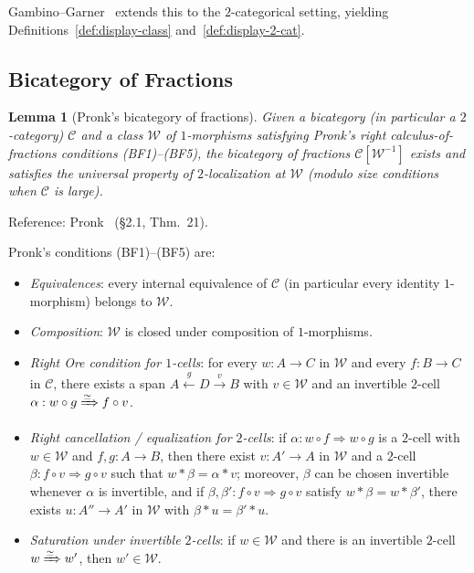 \documentclass[11pt]{article}
\theoremstyle{plain}
\newtheorem{lemma}[theorem]{Lemma}
\theoremstyle{definition}
\newcommand{\cC}{\mathcal{C}}
\begin{document}
Gambino--Garner~\cite{GambinoGarner2008} extends this to the $2$-categorical setting, yielding Definitions~\ref{def:display-class} and~\ref{def:display-2-cat}.

\subsection{Bicategory of Fractions}

\begin{lemma}[Pronk's bicategory of fractions]\label{lem:pronk}
Given a bicategory (in particular a $2$-category) $\cC$ and a class $\mathcal{W}$ of $1$-morphisms satisfying Pronk's right calculus-of-fractions conditions (BF1)--(BF5), the bicategory of fractions $\cC[\mathcal{W}^{-1}]$ exists and satisfies the universal property of $2$-localization at $\mathcal{W}$ (modulo size conditions when $\cC$ is large).
\end{lemma}

Reference: Pronk~\cite{Pronk1996} (\S 2.1, Thm.~21).

Pronk's conditions (BF1)--(BF5) are:
\begin{itemize}
\item[\textbf{(BF1)}] \emph{Equivalences}: every internal equivalence of $\cC$ (in particular every identity $1$-morphism) belongs to $\mathcal{W}$.
\item[\textbf{(BF2)}] \emph{Composition}: $\mathcal{W}$ is closed under composition of $1$-morphisms.
\item[\textbf{(BF3)}] \emph{Right Ore condition for $1$-cells}: for every $w : A \to C$ in $\mathcal{W}$ and every $f : B \to C$ in $\cC$, there exists a span $A \xleftarrow{g} D \xrightarrow{v} B$ with $v \in \mathcal{W}$ and an invertible $2$-cell $\alpha : w \circ g \xRightarrow{\simeq} f \circ v$.
\item[\textbf{(BF4)}] \emph{Right cancellation / equalization for $2$-cells}: if $\alpha : w \circ f \Rightarrow w \circ g$ is a $2$-cell with $w \in \mathcal{W}$ and $f, g : A \to B$, then there exist $v : A' \to A$ in $\mathcal{W}$ and a $2$-cell $\beta : f \circ v \Rightarrow g \circ v$ such that $w \ast \beta = \alpha \ast v$; moreover, $\beta$ can be chosen invertible whenever $\alpha$ is invertible, and if $\beta, \beta' : f \circ v \Rightarrow g \circ v$ satisfy $w \ast \beta = w \ast \beta'$, there exists $u : A'' \to A'$ in $\mathcal{W}$ with $\beta \ast u = \beta' \ast u$.
\item[\textbf{(BF5)}] \emph{Saturation under invertible $2$-cells}: if $w \in \mathcal{W}$ and there is an invertible $2$-cell $w \xRightarrow{\simeq} w'$, then $w' \in \mathcal{W}$.
\end{itemize}
\end{document}
